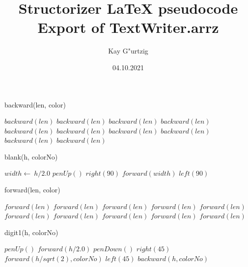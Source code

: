 \documentclass[a4paper,10pt]{article}
\title{Structorizer LaTeX pseudocode Export of TextWriter.arrz}
\author{Kay G"urtzig}
\date{04.10.2021}
\begin{document}
\begin{algorithm}
\caption{backward(len, color)}
\begin{algorithmic}[5]

    \STATE \(backward(len)\)
    \STATE \(backward(len)\)
    \STATE \(backward(len)\)
    \STATE \(backward(len)\)
    \STATE \(backward(len)\)
    \STATE \(backward(len)\)
    \STATE \(backward(len)\)
    \STATE \(backward(len)\)
    \STATE \(backward(len)\)
    \STATE \(backward(len)\)
  \ENDIF

\end{algorithmic}
\end{algorithm}


\begin{algorithm}
\caption{blank(h, colorNo)}
\begin{algorithmic}[5]

\STATE {}
  \STATE \(width\gets\ h/2.0\)
  \STATE \(penUp()\)
  \STATE \(right(90)\)
  \STATE \(forward(width)\)
  \STATE \(left(90)\)

\end{algorithmic}
\end{algorithm}


\begin{algorithm}
\caption{forward(len, color)}
\begin{algorithmic}[5]

    \STATE \(forward(len)\)
    \STATE \(forward(len)\)
    \STATE \(forward(len)\)
    \STATE \(forward(len)\)
    \STATE \(forward(len)\)
    \STATE \(forward(len)\)
    \STATE \(forward(len)\)
    \STATE \(forward(len)\)
    \STATE \(forward(len)\)
    \STATE \(forward(len)\)
  \ENDIF

\end{algorithmic}
\end{algorithm}


\begin{algorithm}
\caption{digit1(h, colorNo)}
\begin{algorithmic}[5]

\STATE {}
\STATE {}
  \STATE \(penUp()\)
  \STATE \(forward(h/2.0)\)
  \STATE \(penDown()\)
  \STATE \(right(45)\)
  \STATE \(forward(h/sqrt(2),colorNo)\)
  \STATE \(left(45)\)
  \STATE \(backward(h,colorNo)\)

\end{algorithmic}
\end{algorithm}
\end{document}
